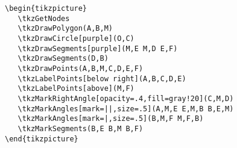 \begin{Verbatim}
\begin{tikzpicture}
   \tkzGetNodes
   \tkzDrawPolygon(A,B,M)
   \tkzDrawCircle[purple](O,C)
   \tkzDrawSegments[purple](M,E M,D E,F)
   \tkzDrawSegments(D,B)
   \tkzDrawPoints(A,B,M,C,D,E,F)
   \tkzLabelPoints[below right](A,B,C,D,E)
   \tkzLabelPoints[above](M,F)
   \tkzMarkRightAngle[opacity=.4,fill=gray!20](C,M,D)
   \tkzMarkAngles[mark=||,size=.5](A,M,E E,M,B B,E,M)
   \tkzMarkAngles[mark=|,size=.5](B,M,F M,F,B)
   \tkzMarkSegments(B,E B,M B,F)
\end{tikzpicture}
\end{Verbatim}


%
\endinput
